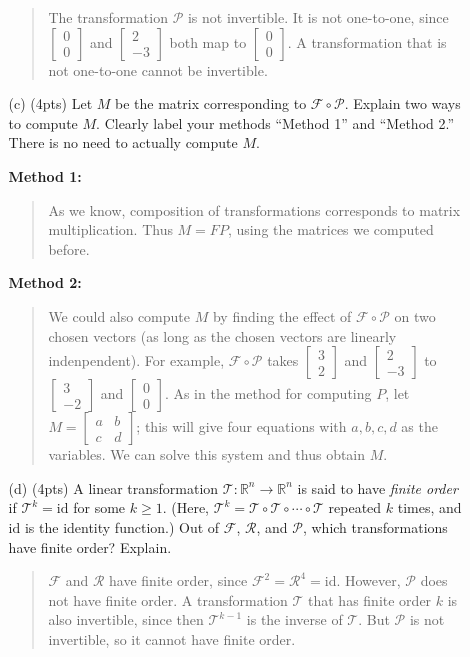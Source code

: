 \documentclass[11pt]{article}
\newcommand{\R}{\mathbb{R}}
\newcommand{\mat}[1]{\begin{bmatrix}#1\end{bmatrix}}
\newenvironment{answer}{\begin{quote}\sffamily}{\end{quote}}
\begin{document}
\begin{enumerate}
\begin{enumerate}
\begin{answer}
			The transformation $\mathcal{P}$ is not invertible.  It is not one-to-one, since $\mat{0\\0}$ and $\mat{2\\-3}$ both map to $\mat{0\\0}$.  A transformation that is not one-to-one cannot be invertible.
		\end{answer}

		\newpage
		\item[(c) (4pts)] Let $M$ be the matrix corresponding to $\mathcal F\circ \mathcal P$.
		Explain two ways to compute $M$.  Clearly label your methods ``Method 1'' and
		``Method 2.''  There is no need to actually compute $M$.

		{\bfseries Method 1:}
		\begin{answer}
			As we know, composition of transformations corresponds to matrix multiplication.  Thus $M = FP$, using the matrices we computed before.
		\end{answer}
		{\bfseries Method 2:}
		\begin{answer}
			We could also compute $M$ by finding the effect of $\mathcal{F} \circ \mathcal{P}$ on two chosen vectors (as long as the chosen vectors are linearly indenpendent).  For example, $\mathcal{F} \circ \mathcal{P}$ takes $\mat{3\\2}$ and $\mat{2\\-3}$ to $\mat{3\\-2}$ and $\mat{0\\0}$.  As in the method for computing $P$, let $M = \mat{a & b \\ c & d}$; this will give four equations with $a,b,c,d$ as the variables.  We can solve this system and thus obtain $M$.
		\end{answer}
		
		\newpage
		\item[(d) (4pts)] A linear transformation $\mathcal T:\R^n\to\R^n$ is said to have
		\emph{finite order} if $\mathcal T^k = \mathrm{id}$ for some $k\geq 1$.  
		(Here, $\mathcal T^k=\mathcal T\circ \mathcal T\circ\cdots\circ \mathcal T$ repeated
		$k$ times, and $\mathrm{id}$ is the identity function.)
		Out of $\mathcal F$, $\mathcal R$,
		and $\mathcal P$, which transformations have finite order?  Explain.
		\begin{answer}
			$\mathcal{F}$ and $\mathcal{R}$ have finite order, since $\mathcal{F}^2 = \mathcal{R}^4 = \mathrm{id}$.  However, $\mathcal{P}$ does not have finite order.  A transformation $\mathcal{T}$ that has finite order $k$ is also invertible, since then $\mathcal{T}^{k-1}$ is the inverse of $\mathcal{T}$.  But $\mathcal{P}$ is not invertible, so it cannot have finite order.
		\end{answer}
		

\end{enumerate}
\end{enumerate}
\end{document}
